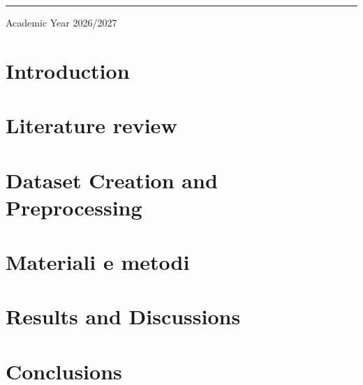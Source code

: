 \documentclass[12pt]{report}
\begin{document}
\begin{titlepage}

\vspace{2.2cm}

\rule{0.78\textwidth}{0.4pt}

\vspace{0.45cm}

{\small
Academic Year 2026/2027
}

\end{titlepage}
\newpage
\null
\thispagestyle{empty}
\tableofcontents
\thispagestyle{empty}
\clearpage
\newpage
\null
\setcounter{page}{1}
\chapter*{Introduction}
\label{ch:intro}

\clearpage
\chapter{Literature review}
\label{ch:LiteratureReview}

\clearpage
\chapter{Dataset Creation and Preprocessing}
\label{ch:dataset}

\clearpage
\chapter{Materiali e metodi}
\label{ch:MeMs}

\clearpage
\chapter{Results and Discussions}
\label{ch:results}

\clearpage
\chapter{Conclusions}
\label{ch:conclusion} 

\clearpage
\end{document}

